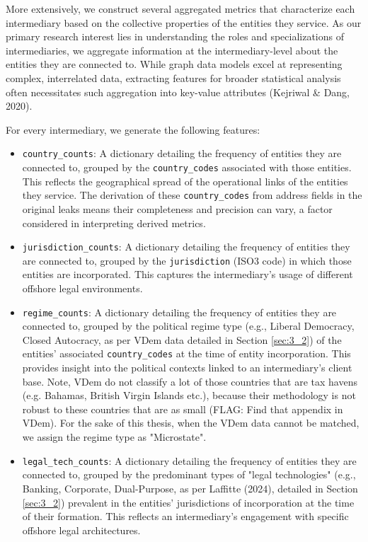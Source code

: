 More extensively, we construct several aggregated metrics that characterize each intermediary based on the collective properties of the entities they service. As our primary research interest lies in understanding the roles and specializations of intermediaries, we aggregate information at the intermediary-level about the entities they are connected to. While graph data models excel at representing complex, interrelated data, extracting features for broader statistical analysis often necessitates such aggregation into key-value attributes (Kejriwal \& Dang, 2020).

For every intermediary, we generate the following features:

\begin{itemize}
   \item \texttt{country\_counts}: A dictionary detailing the frequency of entities they are connected to, grouped by the \texttt{country\_codes} associated with those entities. This reflects the geographical spread of the operational links of the entities they service. The derivation of these \texttt{country\_codes} from address fields in the original leaks means their completeness and precision can vary, a factor considered in interpreting derived metrics.
   \item \texttt{jurisdiction\_counts}: A dictionary detailing the frequency of entities they are connected to, grouped by the \texttt{jurisdiction} (ISO3 code) in which those entities are incorporated. This captures the intermediary's usage of different offshore legal environments.
   \item \texttt{regime\_counts}: A dictionary detailing the frequency of entities they are connected to, grouped by the political regime type (e.g., Liberal Democracy, Closed Autocracy, as per VDem data detailed in Section \ref{sec:3_2}) of the entities' associated \texttt{country\_codes} at the time of entity incorporation. This provides insight into the political contexts linked to an intermediary's client base. Note, VDem do not classify a lot of those countries that are tax havens (e.g. Bahamas, British Virgin Islands etc.), because their methodology is not robust to these countries that are as small (FLAG: Find that appendix in VDem). For the sake of this thesis, when the VDem data cannot be matched, we assign the regime type as "Microstate".
   \item \texttt{legal\_tech\_counts}: A dictionary detailing the frequency of entities they are connected to, grouped by the predominant types of "legal technologies" (e.g., Banking, Corporate, Dual-Purpose, as per Laffitte (2024), detailed in Section \ref{sec:3_2}) prevalent in the entities' jurisdictions of incorporation at the time of their formation. This reflects an intermediary's engagement with specific offshore legal architectures.
\end{itemize}

